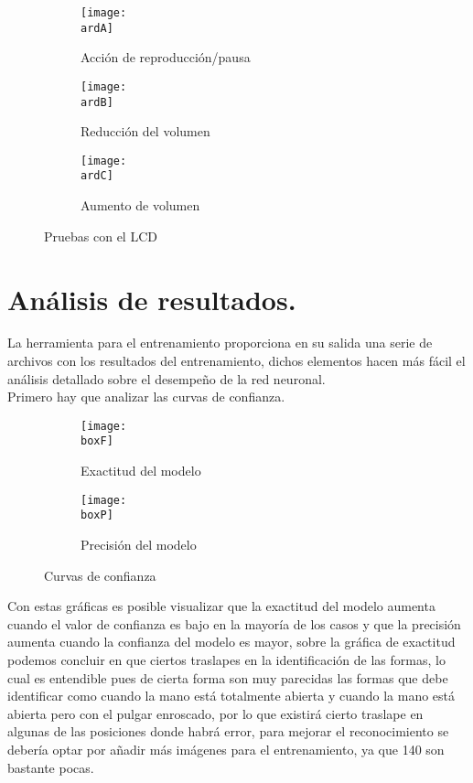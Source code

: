 \documentclass[a4paper, 12pt]{article}
\newcommand{\ardA}{img/ard_1.png}
\newcommand{\ardB}{img/ard_2.png}
\newcommand{\ardC}{img/ard_3.png}
\newcommand{\boxF}{img/BoxF1_curve.png}
\newcommand{\boxP}{img/BoxP_curve.png}
\begin{document}
	\begin{figure}[H]
		\begin{subfigure}[h]{0.5\textwidth}
			\texttt{[image: \\ardA]}
			\caption{Acción de reproducción/pausa}
		\end{subfigure}
		\begin{subfigure}[h]{0.5\textwidth}
			\texttt{[image: \\ardB]}
			\caption{Reducción del volumen}
		\end{subfigure}
		\begin{subfigure}[h]{1\textwidth}
			\centering
			\texttt{[image: \\ardC]}
			\caption{Aumento de volumen}
		\end{subfigure}
		\caption{Pruebas con el LCD}
	\end{figure}

	\clearpage

	\section{Análisis de resultados.}
	La herramienta para el entrenamiento proporciona en su salida una serie de archivos con los resultados del entrenamiento, dichos elementos hacen más fácil el análisis detallado sobre el desempeño de la red neuronal.\\
    Primero hay que analizar las curvas de confianza.

	\begin{figure}[H]
        \centering
		\begin{subfigure}{0.45\linewidth}
			\texttt{[image: \\boxF]}
			\label{F1_curve}
			\caption{Exactitud del modelo}
		\end{subfigure}
		\begin{subfigure}{0.45\linewidth}
			\texttt{[image: \\boxP]}
			\label{P_curve}
			\caption{Precisión del modelo}
		\end{subfigure}
		\caption{Curvas de confianza}
	\end{figure}

	Con estas gráficas es posible visualizar que la exactitud del modelo aumenta cuando el valor de confianza es bajo en la mayoría de los casos y que la precisión aumenta cuando la confianza del modelo es mayor, sobre la gráfica de exactitud podemos concluir en que ciertos traslapes en la identificación de las formas, lo cual es entendible pues de cierta forma son muy parecidas las formas que debe identificar como cuando la mano está totalmente abierta y cuando la mano está abierta pero con el pulgar enroscado, por lo que existirá cierto traslape en algunas de las posiciones donde habrá error, para mejorar el reconocimiento se debería optar por añadir más imágenes para el entrenamiento, ya que 140 son bastante pocas.
\end{document}
